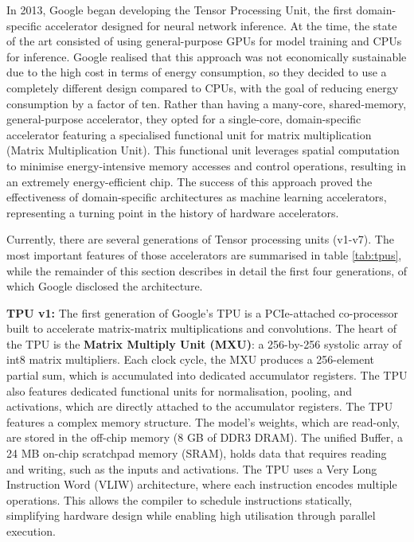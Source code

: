 In 2013, Google began developing the Tensor Processing Unit, the first domain-specific accelerator designed for neural network inference.
At the time, the state of the art consisted of using general-purpose GPUs for model training and CPUs for inference. Google realised that this approach was not economically sustainable due to the high cost in terms of energy consumption, so they decided to use a completely different design compared to CPUs, with the goal of reducing energy consumption by a factor of ten. Rather than having a many-core, shared-memory, general-purpose accelerator, they opted for a single-core, domain-specific accelerator featuring a specialised functional unit for matrix multiplication (Matrix Multiplication Unit). This functional unit leverages spatial computation to minimise energy-intensive memory accesses and control operations\cite{jouppi2018motivation}, resulting in an extremely energy-efficient chip.
The success of this approach proved the effectiveness of domain-specific architectures as machine learning accelerators, representing a turning point in the history of hardware accelerators.

Currently, there are several generations of Tensor processing units (v1-v7). The most important features of those accelerators are summarised in table \ref{tab:tpus}, while the remainder of this section describes in detail the first four generations, of which Google disclosed the architecture.

\textbf{TPU v1:} The first generation of Google's TPU\cite{Jouppi2017} is a PCIe-attached co-processor built to accelerate matrix-matrix multiplications and convolutions. The heart of the TPU is the \textbf{Matrix Multiply Unit (MXU)}: a 256-by-256 systolic array of int8 matrix multipliers. Each clock cycle, the MXU produces a 256-element partial sum, which is accumulated into dedicated accumulator registers. The TPU also features dedicated functional units for normalisation, pooling, and activations, which are directly attached to the accumulator registers.
The TPU features a complex memory structure. The model's weights, which are read-only, are stored in the off-chip memory (8 GB of DDR3 DRAM). The unified Buffer, a 24 MB on-chip scratchpad memory (SRAM), holds data that requires reading and writing, such as the inputs and activations.
The TPU uses a Very Long Instruction Word (VLIW) architecture, where each instruction encodes multiple operations. This allows the compiler to schedule instructions statically, simplifying hardware design while enabling high utilisation through parallel execution.

